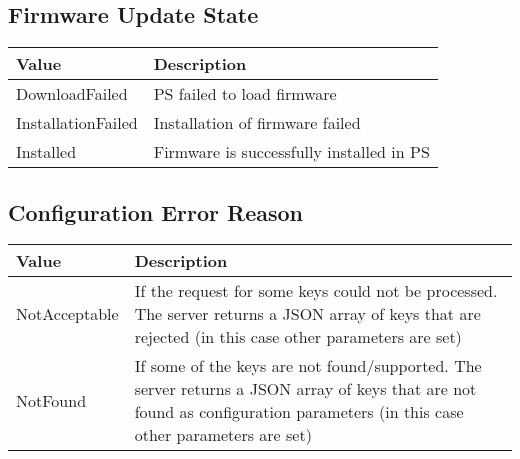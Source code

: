 \subsection{Firmware Update State}
\label{types:FirmwareState}

\begin{tabularx}{\linewidth}{ | l | X | }
  \hline
  \rowcolor{table-head}
  Value & Description \\
  \hline
  DownloadFailed 		& \acs{PS} failed to load firmware \\
  InstallationFailed 	& Installation of firmware failed \\
  Installed				& Firmware is successfully installed in \acs{PS} \\
  \hline
\end{tabularx}

\subsection{Configuration Error Reason}
\label{types:ConfigErrorReason}

\begin{tabularx}{\linewidth}{ | l | X | }
  \hline
  \rowcolor{table-head}
  Value & Description \\
  \hline
  NotAcceptable 		& If the request for some keys could not be processed. The server returns a JSON array of keys that are rejected (in this case other parameters are set) \\
  NotFound 	& If some of the keys are not found/supported. The server returns a JSON array of keys that are not found as configuration parameters (in this case other parameters are set) \\
  \hline
\end{tabularx}

%
